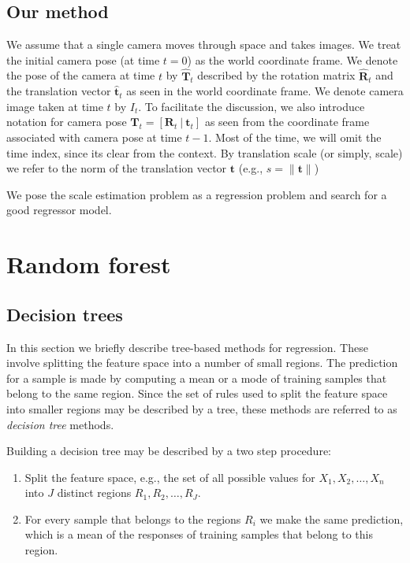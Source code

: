 \documentclass{article}
\begin{document}
\subsection{Our method}

We assume that a single camera moves through space and takes images.
We treat the initial camera pose (at time $t=0$) as the world
coordinate frame.  We denote the pose of the camera at time $t$ by
$\mathbf{\hat{T}}_t$ described by the rotation matrix
$\mathbf{\hat{R}}_t$ and the translation vector $\mathbf{\hat{t}}_t$
as seen in the world coordinate frame.  We denote camera image taken
at time $t$ by $I_t$.  To facilitate the discussion, we also introduce
notation for camera pose
$\mathbf{T}_t = [\mathbf{R}_t\ |\ \mathbf{t}_t] $ as seen from the
coordinate frame associated with camera pose at time $t-1$.  Most of
the time, we will omit the time index, since its clear from the
context.  By translation scale (or simply, scale) we refer to the norm
of the translation vector $\mathbf{t}$ (e.g.,
$s = \lVert \mathbf{t} \rVert$)

We pose the scale estimation problem as a regression problem and
search for a good regressor model.

\section{Random forest}

\subsection{Decision trees}

In this section we briefly describe tree-based methods for regression.
These involve splitting the feature space into a number of small
regions.  The prediction for a sample is made by computing a mean or a
mode of training samples that belong to the same region.  Since the
set of rules used to split the feature space into smaller regions may
be described by a tree, these methods are referred to as
\textit{decision tree} methods.

Building a decision tree may be described by a two step procedure:
\begin{enumerate}
\item Split the feature space, e.g., the set of all possible values
  for $X_1, X_2,\ldots,X_n$ into $J$ distinct regions $R_1, R_2,\ldots, R_J$.
\item For every sample that belongs to the regions $R_i$ we make the
  same prediction, which is a mean of the responses of training
  samples that belong to this region.
\end{enumerate}
\end{document}
